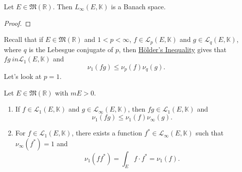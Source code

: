 \documentclass[notoc,notitlepage]{tufte-book}
\begin{document}
\begin{thm}\label{thm:completeness_of_l_infty_e_k_}
  Let $E \in \mathfrak{M}(\mathbb{R})$.
  Then $L_\infty(E, \mathbb{K})$ is a Banach space.
\end{thm}

\begin{proof}
\end{proof}

Recall that if $E \in \mathfrak{M}(\mathbb{R})$ and $1 < p < \infty$,
$f \in \mathcal{L}_p(E, \mathbb{K})$ and $g \in \mathcal{L}_q(E, \mathbb{K})$,
where $q$ is the Lebesgue conjugate of $p$,
then \hyperref[thm:holders_inequality]{H\"{o}lder's Inequality}
gives that $fg\ in \mathcal{L}_1(E, \mathbb{K})$ and
\begin{equation*}
  \nu_1(fg) \leq \nu_p(f) \nu_q(g).
\end{equation*}
Let's look at $p = 1$.

\begin{thm}\label{thm:holder_s_inequality_for_l_1_e_k_}
  Let $E \in \mathfrak{M}(\mathbb{R})$ with $mE > 0$.
  \begin{enumerate}
    \item If $f \in \mathcal{L}_1(E, \mathbb{K})$ and
      $g \in \mathcal{L}_\infty(E, \mathbb{K})$, then $fg \in \mathcal{L}_1(E,
      \mathbb{K})$ and
      \begin{equation*}
        \nu_1(fg) \leq \nu_1(f) \nu_\infty(g).
      \end{equation*}

    \item For $f \in \mathcal{L}_1(E, \mathbb{K})$,
      there exists a function $f^* \in \mathcal{L}_\infty(E, \mathbb{K})$
      such that $\nu_\infty(f^*) = 1$ and
      \begin{equation*}
        \nu_1(ff^*) = \int_{E} f \cdot f^* = \nu_1(f).
      \end{equation*}
  \end{enumerate}
\end{thm}
\end{document}
